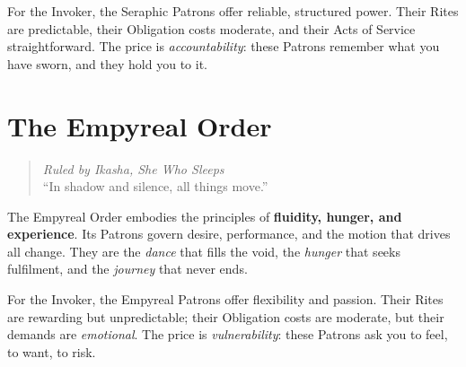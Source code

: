 For the Invoker, the Seraphic Patrons offer reliable, structured power. Their Rites are predictable, their Obligation costs moderate, and their Acts of Service straightforward. The price is \emph{accountability}: these Patrons remember what you have sworn, and they hold you to it.

\newpage

\newpage
\newpage
\newpage
\newpage
\newpage
\newpage
\newpage
\newpage
\newpage
\newpage


\section{The Empyreal Order}
\label{sec:empyreal-order}

\begin{quote}
\textit{Ruled by Ikasha, She Who Sleeps} \\
``In shadow and silence, all things move.''
\end{quote}

The Empyreal Order embodies the principles of \textbf{fluidity, hunger, and experience}. Its Patrons govern desire, performance, and the motion that drives all change. They are the \emph{dance} that fills the void, the \emph{hunger} that seeks fulfilment, and the \emph{journey} that never ends.

For the Invoker, the Empyreal Patrons offer flexibility and passion. Their Rites are rewarding but unpredictable; their Obligation costs are moderate, but their demands are \emph{emotional}. The price is \emph{vulnerability}: these Patrons ask you to feel, to want, to risk.

